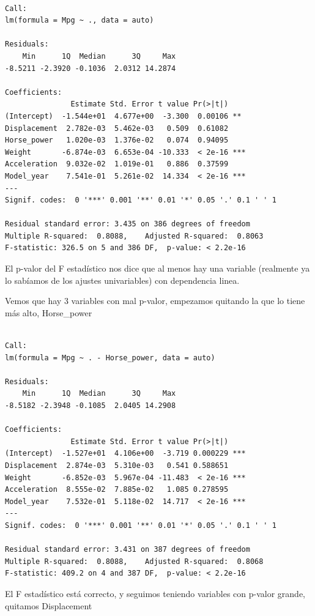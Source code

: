 \begin{verbatim}

Call:
lm(formula = Mpg ~ ., data = auto)

Residuals:
    Min      1Q  Median      3Q     Max 
-8.5211 -2.3920 -0.1036  2.0312 14.2874 

Coefficients:
               Estimate Std. Error t value Pr(>|t|)    
(Intercept)  -1.544e+01  4.677e+00  -3.300  0.00106 ** 
Displacement  2.782e-03  5.462e-03   0.509  0.61082    
Horse_power   1.020e-03  1.376e-02   0.074  0.94095    
Weight       -6.874e-03  6.653e-04 -10.333  < 2e-16 ***
Acceleration  9.032e-02  1.019e-01   0.886  0.37599    
Model_year    7.541e-01  5.261e-02  14.334  < 2e-16 ***
---
Signif. codes:  0 '***' 0.001 '**' 0.01 '*' 0.05 '.' 0.1 ' ' 1

Residual standard error: 3.435 on 386 degrees of freedom
Multiple R-squared:  0.8088,    Adjusted R-squared:  0.8063 
F-statistic: 326.5 on 5 and 386 DF,  p-value: < 2.2e-16
\end{verbatim}

El p-valor del F estadístico nos dice que al menos hay una variable
(realmente ya lo sabíamos de los ajustes univariables) con dependencia
linea.

Vemos que hay 3 variables con mal p-valor, empezamos quitando la que lo
tiene más alto, Horse\_power

\begin{verbatim}

Call:
lm(formula = Mpg ~ . - Horse_power, data = auto)

Residuals:
    Min      1Q  Median      3Q     Max 
-8.5182 -2.3948 -0.1085  2.0405 14.2908 

Coefficients:
               Estimate Std. Error t value Pr(>|t|)    
(Intercept)  -1.527e+01  4.106e+00  -3.719 0.000229 ***
Displacement  2.874e-03  5.310e-03   0.541 0.588651    
Weight       -6.852e-03  5.967e-04 -11.483  < 2e-16 ***
Acceleration  8.555e-02  7.885e-02   1.085 0.278595    
Model_year    7.532e-01  5.118e-02  14.717  < 2e-16 ***
---
Signif. codes:  0 '***' 0.001 '**' 0.01 '*' 0.05 '.' 0.1 ' ' 1

Residual standard error: 3.431 on 387 degrees of freedom
Multiple R-squared:  0.8088,    Adjusted R-squared:  0.8068 
F-statistic: 409.2 on 4 and 387 DF,  p-value: < 2.2e-16
\end{verbatim}

El F estadístico está correcto, y seguimos teniendo variables con p-valor grande, quitamos Displacement


